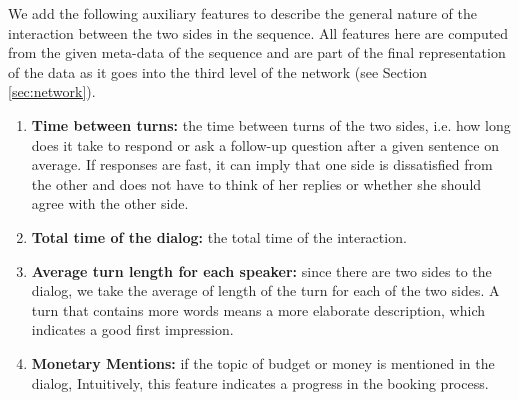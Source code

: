 



We add the following auxiliary features 
to describe the general nature 
of the interaction between the two sides 
in the sequence. All features here 
are computed from the given meta-data of the sequence and 
are part of the final representation of the data as it goes into the 
third level of the network (see Section \ref{sec:network}). 

\begin{enumerate}
\item {\bf Time between turns: } the time between 
turns of the two sides, i.e. how long does it take to respond or ask a follow-up 
question after a given sentence on average. 
If responses are fast, it can imply that one side is dissatisfied 
from the other and does not have to think of her replies or whether 
she should agree with the other side.\label{itm:between}

\item {\bf Total time of the dialog: } the total time of the interaction. \label{itm:total}

\item {\bf Average turn length for each speaker: } since there are two sides to the dialog, 
we take the average of length of the turn for each of the two sides. 
A turn that contains more words means a more elaborate description, which indicates 
a good first impression.\label{itm:sent}


\item {\bf Monetary Mentions: } if the topic of budget or money is mentioned in the dialog, 
Intuitively, this feature indicates a progress in the booking process.\label{itm:budget}

\end{enumerate} 

